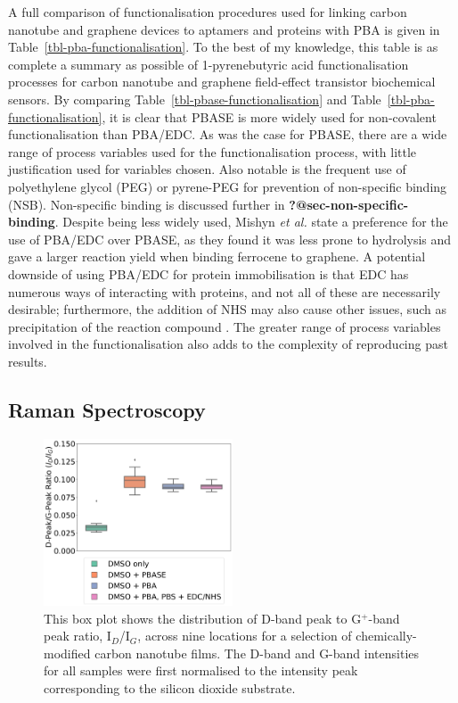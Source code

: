 \documentclass[
  a4paper,
]{scrbook}
\begin{document}
A full comparison of functionalisation procedures used for linking
carbon nanotube and graphene devices to aptamers and proteins with PBA
is given in Table~\ref{tbl-pba-functionalisation}. To the best of my
knowledge, this table is as complete a summary as possible of
1-pyrenebutyric acid functionalisation processes for carbon nanotube and
graphene field-effect transistor biochemical sensors. By comparing
Table~\ref{tbl-pbase-functionalisation} and
Table~\ref{tbl-pba-functionalisation}, it is clear that PBASE is more
widely used for non-covalent functionalisation than PBA/EDC. As was the
case for PBASE, there are a wide range of process variables used for the
functionalisation process, with little justification used for variables
chosen. Also notable is the frequent use of polyethylene glycol (PEG) or
pyrene-PEG for prevention of non-specific binding (NSB). Non-specific
binding is discussed further in \textbf{?@sec-non-specific-binding}.
Despite being less widely used, Mishyn \emph{et al.}
\autocite{Mishyn2022} state a preference for the use of PBA/EDC over
PBASE, as they found it was less prone to hydrolysis and gave a larger
reaction yield when binding ferrocene to graphene. A potential downside
of using PBA/EDC for protein immobilisation is that EDC has numerous
ways of interacting with proteins, and not all of these are necessarily
desirable; furthermore, the addition of NHS may also cause other issues,
such as precipitation of the reaction compound
\autocite{Hermanson2013-4}. The greater range of process variables
involved in the functionalisation also adds to the complexity of
reproducing past results.

\hypertarget{raman-spectroscopy}{%
\subsection{Raman Spectroscopy}\label{raman-spectroscopy}}

\begin{figure}

{\centering \includegraphics[width=0.5\textwidth,height=\textheight]{figures/ch7/comparison_raman.png}

}

\caption{\label{fig-linker-raman}This box plot shows the distribution of
D-band peak to G\(^+\)-band peak ratio, I\(_D\)/I\(_G\), across nine
locations for a selection of chemically-modified carbon nanotube films.
The D-band and G-band intensities for all samples were first normalised
to the intensity peak corresponding to the silicon dioxide substrate.}

\end{figure}
\end{document}
